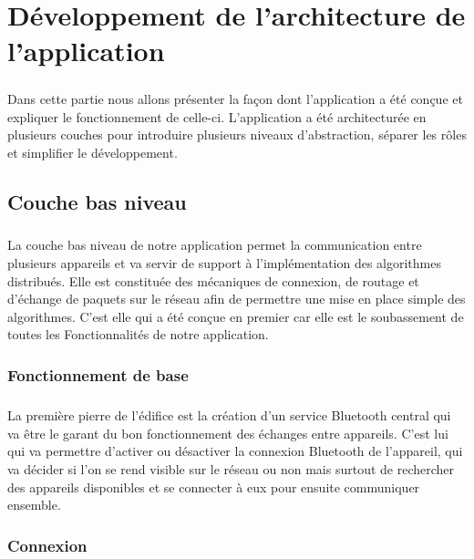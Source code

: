 \documentclass[a4paper,10pt]{report}
\begin{document}
\chapter{Développement de l'architecture de l'application}
  \paragraph{}
  Dans cette partie nous allons présenter la façon dont l'application a été conçue et expliquer le fonctionnement de celle-ci. L'application a été architecturée en plusieurs couches pour introduire plusieurs niveaux d'abstraction, séparer les rôles et simplifier le développement.
  
  \section{Couche bas niveau}
    \paragraph{}
    La couche bas niveau de notre application permet la communication entre plusieurs appareils et va servir de support à l'implémentation des algorithmes distribués. Elle est constituée des mécaniques de connexion, de routage et d'échange de paquets sur le réseau afin de permettre une mise en place simple des algorithmes. C'est elle qui a été conçue en premier car elle est le soubassement de toutes les Fonctionnalités de notre application.
  
    \subsection{Fonctionnement de base}
    \paragraph{}
    La première pierre de l'édifice est la création d'un service Bluetooth central qui va être le garant du bon fonctionnement des échanges entre appareils. C'est lui qui va permettre d'activer ou désactiver la connexion Bluetooth de l'appareil, qui va décider si l'on se rend visible sur le réseau ou non mais surtout de rechercher des appareils disponibles et se connecter à eux pour ensuite communiquer ensemble.
    
    \subsection{Connexion}
\end{document}
